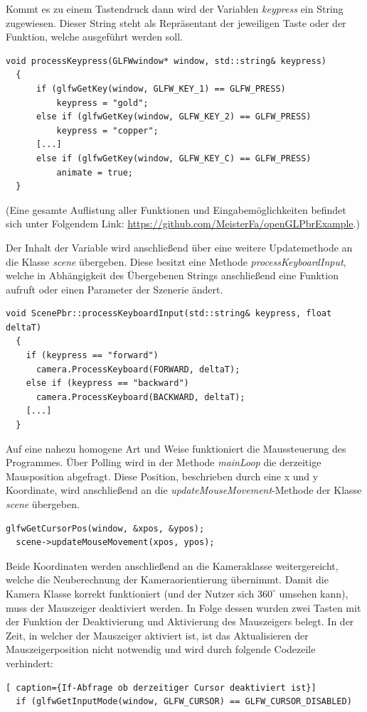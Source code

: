 \documentclass[
  11pt,
  a4paper,
  oneside
  ]{article}
\begin{document}
Kommt es zu einem Tastendruck dann wird der Variablen \textit{keypress} ein String zugewiesen. Dieser String steht als Repräsentant der jeweiligen Taste oder der Funktion, welche ausgeführt werden soll. 
\begin{lstlisting}[tabsize=2, caption={Methode processKeypress der Scenerunner-Klasse zur Zuweisung von Strings}]
  void processKeypress(GLFWwindow* window, std::string& keypress)
  {
      if (glfwGetKey(window, GLFW_KEY_1) == GLFW_PRESS)
          keypress = "gold";
      else if (glfwGetKey(window, GLFW_KEY_2) == GLFW_PRESS)
          keypress = "copper";
      [...]
      else if (glfwGetKey(window, GLFW_KEY_C) == GLFW_PRESS)
          animate = true;
  }
\end{lstlisting}
(Eine gesamte Auflistung aller Funktionen und Eingabemöglichkeiten befindet sich unter Folgendem Link: \url{https://github.com/MeisterFa/openGLPbrExample}.) 

Der Inhalt der Variable wird anschließend über eine weitere Updatemethode an die Klasse \textit{scene} übergeben. Diese besitzt eine Methode \textit{processKeyboardInput}, welche in Abhängigkeit des Übergebenen Strings anschließend eine Funktion aufruft oder einen Parameter der Szenerie ändert. 
\begin{lstlisting}[tabsize=2, caption={Ausschnitt der processKeyboardInput-Methode der Klasse ScenePbr}]
  void ScenePbr::processKeyboardInput(std::string& keypress, float deltaT)
  {
    if (keypress == "forward")
      camera.ProcessKeyboard(FORWARD, deltaT);
    else if (keypress == "backward")
      camera.ProcessKeyboard(BACKWARD, deltaT);
    [...]
  }
\end{lstlisting}

Auf eine nahezu homogene Art und Weise funktioniert die Maussteuerung des Programmes. Über Polling wird in der Methode \textit{mainLoop} die derzeitige Mausposition abgefragt. Diese Position, beschrieben durch eine x und y Koordinate, wird anschließend an die \textit{updateMouseMovement}-Methode der Klasse \textit{scene} übergeben. 
\begin{lstlisting}[caption={Funktionsaufrufe zum empfangen und setzen der Mausposition}]
  glfwGetCursorPos(window, &xpos, &ypos);
  scene->updateMouseMovement(xpos, ypos);
\end{lstlisting}

Beide Koordinaten werden anschließend an die Kameraklasse weitergereicht, welche die Neuberechnung der Kameraorientierung übernimmt. Damit die Kamera Klasse korrekt funktioniert (und der Nutzer sich $360^\circ$ umsehen kann), muss der Mauszeiger deaktiviert werden. In Folge dessen wurden zwei Tasten mit der Funktion der Deaktivierung und Aktivierung des Mauszeigers belegt. In der Zeit, in welcher der Mauszeiger aktiviert ist, ist das Aktualisieren der Mauszeigerposition nicht notwendig und wird durch folgende Codezeile verhindert: 
\begin{lstlisting}[ caption={If-Abfrage ob derzeitiger Cursor deaktiviert ist}]
  if (glfwGetInputMode(window, GLFW_CURSOR) == GLFW_CURSOR_DISABLED)
\end{lstlisting}
\end{document}
